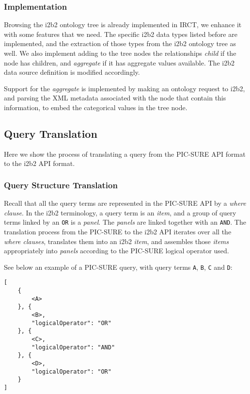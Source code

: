 \subsubsection{Implementation}

Browsing the i2b2 ontology tree is already implemented in IRCT, we enhance it with some features that we need.
The specific i2b2 data types listed before are implemented, and the extraction of those types from the i2b2 ontology tree as well.
We also implement adding to the tree nodes the relationships \emph{child} if the node has children, and \emph{aggregate} if it has aggregate values available.
The i2b2 data source definition is modified accordingly.

Support for the \emph{aggregate} is implemented by making an ontology request to i2b2, and parsing the XML metadata associated with the node that contain this information, to embed the categorical values in the tree node.


\subsection{Query Translation}
\label{sec:interop-layer-query-translation}

Here we show the process of translating a query from the PIC-SURE API format to the i2b2 API format.

\subsubsection{Query Structure Translation}

Recall that all the query terms are represented in the PIC-SURE API by a \emph{where clause}.
In the i2b2 terminology, a query term is an \emph{item}, and a group of query terms linked by an \verb|OR| is a \emph{panel}.
The \emph{panels} are linked together with an \verb|AND|.
The translation process from the PIC-SURE to the i2b2 API iterates over all the \emph{where clauses}, translates them into an i2b2 \emph{item}, and assembles those \emph{items} appropriately into \emph{panels} according to the PIC-SURE logical operator used.

\begin{samepage}
See below an example of a PIC-SURE query, with query terms \verb|A|, \verb|B|, \verb|C| and \verb|D|:
\begin{verbatim}
[
    { 
        <A>
    }, {
        <B>,
        "logicalOperator": "OR"
    }, {
        <C>,
        "logicalOperator": "AND"
    }, {
        <D>,
        "logicalOperator": "OR"
    }
]
\end{verbatim}
\end{samepage}

